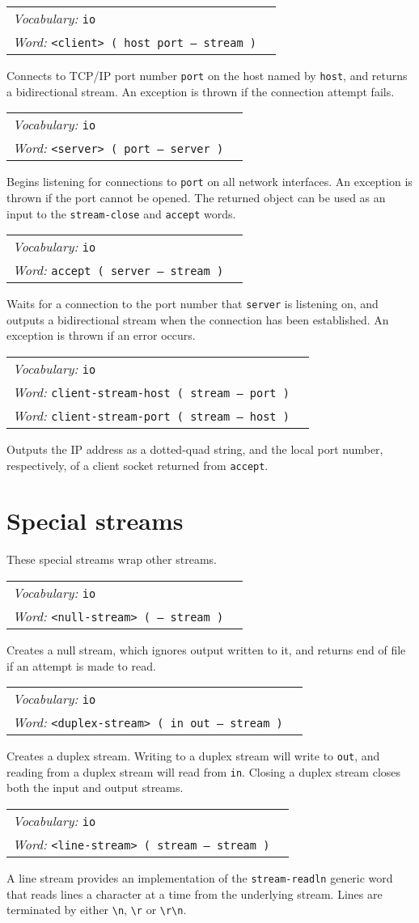 \documentclass{book}
\newcommand{\vocabulary}[1]{\emph{Vocabulary:} \texttt{#1}&\\}
\newcommand{\ordinaryword}[2]{\index{\texttt{#1}}\emph{Word:} \texttt{#2}&\\}
\newcommand{\wordtable}[1]{


\begin{tabularx}{12cm}{lX}
\hline
#1
\hline
\end{tabularx}

}
\begin{document}
\wordtable{
\vocabulary{io}
\ordinaryword{<client>}{<client>~( host port -- stream~)}

}
Connects to TCP/IP port number \texttt{port} on the host named by \texttt{host}, and returns a bidirectional stream. An exception is thrown if the connection attempt fails.
\wordtable{
\vocabulary{io}
\ordinaryword{<server>}{<server>~( port -- server~)}

}
Begins listening for connections to \texttt{port} on all network interfaces. An exception is thrown if the port cannot be opened. The returned object can be used as an input to the \texttt{stream-close} and \texttt{accept} words.
\wordtable{
\vocabulary{io}
\ordinaryword{accept}{accept~( server -- stream~)}

}
Waits for a connection to the port number that \texttt{server} is listening on, and outputs a bidirectional stream when the connection has been established.  An exception is thrown if an error occurs.
\wordtable{
\vocabulary{io}
\ordinaryword{client-stream-host}{client-stream-host~( stream -- port~)}
\ordinaryword{client-stream-port}{client-stream-port~( stream -- host~)}

}
Outputs the IP address as a dotted-quad string, and the local port number, respectively, of a client socket returned from \texttt{accept}.

\section{Special streams}\label{special-streams}

These special streams wrap other streams. 


\wordtable{
\vocabulary{io}
\ordinaryword{<null-stream>}{<null-stream>~( -- stream~)}
}
Creates a null stream, which ignores output written to it, and returns end of file if an attempt is made to read.
\wordtable{
\vocabulary{io}
\ordinaryword{<duplex-stream>}{<duplex-stream>~( in out -- stream~)}
}
Creates a duplex stream. Writing to a duplex stream will write to \texttt{out}, and reading from a duplex stream will read from \texttt{in}. Closing a duplex stream closes both the input and output streams.
\wordtable{
\vocabulary{io}
\ordinaryword{<line-stream>}{<line-stream>~( stream -- stream~)}
}
A line stream provides an implementation of the \verb|stream-readln| generic word that reads lines a character at a time from the underlying stream. Lines are terminated by either \verb|\n|, \verb|\r| or \verb|\r\n|.
\end{document}
